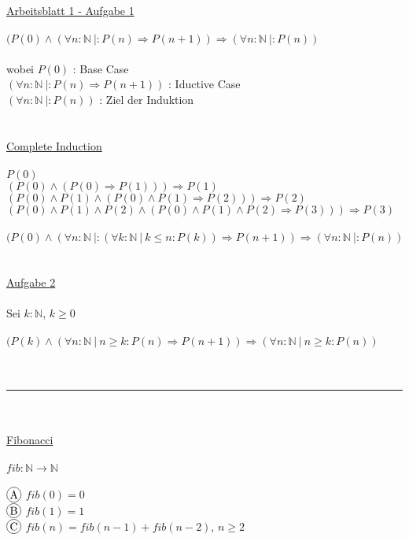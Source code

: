 \documentclass[18pt,a4paper]{article}
\newcommand*\circled[1]{\tikz[baseline=(char.base)]{
            \node[shape=circle,draw,inner sep=1pt] (char) {#1};}}
\newcommand{\tab}{\hspace*{2em}}
\begin{document}
\uline{Arbeitsblatt 1 - Aufgabe 1}\\
\\
$(P(0)\wedge (\forall{n} : \mathbb{N} \:\vert : P(n) \Rightarrow P(n+1)) \Rightarrow (\forall{n} : \mathbb{N} \:\vert : P(n))$\\
\\
wobei $P(0)$ : Base Case\\
\tab $(\forall{n} : \mathbb{N} \:\vert : P(n) \Rightarrow P(n+1))$ : Iductive Case\\
\tab $(\forall{n} : \mathbb{N} \:\vert : P(n))$ : Ziel der Induktion\\
\\
\\
\uline{Complete Induction}\\
\\
$P(0)$\\
$(P(0) \wedge (P(0) \Rightarrow P(1))) \Rightarrow P(1)$\\
$(P(0) \wedge P(1) \wedge (P(0) \wedge P(1) \Rightarrow P(2))) \Rightarrow P(2)$\\
$(P(0) \wedge P(1) \wedge P(2) \wedge (P(0) \wedge P(1) \wedge P(2) \Rightarrow P(3))) \Rightarrow P(3)$\\
\\
$(P(0)\wedge (\forall{n} : \mathbb{N} \:\vert : (\forall{k} : \mathbb{N} \:\vert\: k\leqslant n : P(k)) \Rightarrow P(n+1)) \Rightarrow (\forall{n} : \mathbb{N} \:\vert : P(n))$\\
\\
\\
\uline{Aufgabe 2}\\
\\
Sei $k: \mathbb{N}$, $k\geqslant0$\\
\\
$(P(k)\wedge (\forall{n} : \mathbb{N} \:\vert\: n\geqslant k : P(n) \Rightarrow P(n+1)) \Rightarrow (\forall{n} : \mathbb{N} \:\vert\: n\geqslant k : P(n))$\\
\\
\\
\rule{\textwidth}{0.4mm}\\
\\
\uline{Fibonacci}\\
\\
$fib : \mathbb{N} \rightarrow \mathbb{N}$\\
\\
$\circled{A}$ $fib(0) = 0$\\
$\circled{B}$ $fib(1) = 1$\\
$\circled{C}$ $fib(n) = fib(n-1) + fib(n-2)$, $n\geqslant 2$\\
\end{document}
